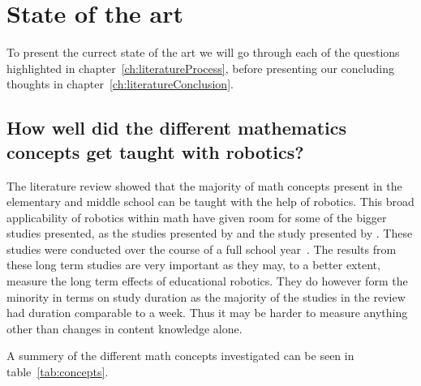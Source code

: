 \chapter{State of the art}\label{ch:stateOfArt}
To present the currect state of the art we will go through each of the questions highlighted in chapter~\ref{ch:literatureProcess}, before presenting our concluding thoughts in chapter~\ref{ch:literatureConclusion}.

\section{How well did the different mathematics concepts get taught with robotics?}
The literature review showed that the majority of math concepts present in the elementary and middle school can be taught with the help of robotics. 
This broad applicability of robotics within math have given room for some of the bigger studies presented, as the studies presented by \citeauthor{hussain2006effect} and the study presented by \citeauthor{lindh2007does}. These studies were conducted over the course of a full school year~\cite{hussain2006effect,lindh2007does}. 
The results from these long term studies are very important as they may, to a better extent, measure the long term effects of educational robotics. 
They do however form the minority in terms on study duration as the majority of the studies in the review had duration comparable to a week. 
Thus it may be harder to measure anything other than changes in content knowledge alone.

\bigskip\noindent
A summery of the different math concepts investigated can be seen in table~\ref{tab:concepts}. 

